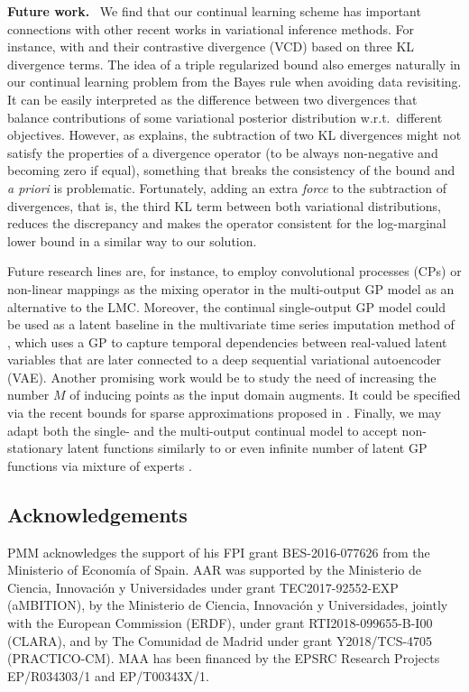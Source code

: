 \documentclass[]{article}
\begin{document}
\textbf{Future work.}~ We find that our continual learning scheme has important connections with other recent works in variational inference methods. For instance, with \citet{ruiz2019contrastive} and their contrastive divergence (VCD) based on three KL divergence terms. The idea of a triple regularized bound also emerges naturally in our continual learning problem from the Bayes rule when avoiding data revisiting. It can be easily interpreted as the difference between two divergences that balance contributions of some variational posterior distribution w.r.t.\ different objectives. However, as \citet{ruiz2019contrastive} explains, the subtraction of two KL divergences might not satisfy the properties of a divergence operator (to be always non-negative and becoming zero if equal), something that breaks the consistency of the bound and \textit{a priori} is problematic. Fortunately, adding an extra \textit{force} to the subtraction of divergences, that is, the third KL term between both variational distributions, reduces the discrepancy and makes the operator consistent for the log-marginal lower bound in a similar way to our solution. 

Future research lines are, for instance, to employ convolutional processes (CPs) or non-linear mappings as the mixing operator in the multi-output GP model as an alternative to the LMC. Moreover, the continual single-output GP model could be used as a latent baseline in the multivariate time series imputation method of \citet{fortuin2019multivariate}, which uses a GP to capture temporal dependencies between real-valued latent variables that are later connected to a deep sequential variational autoencoder (VAE). Another promising work would be to study the need of  increasing the number $M$ of inducing points as the input domain augments. It could be specified via the recent bounds for sparse approximations proposed in \citet{burt2019rates}. Finally, we may adapt both the single- and the multi-output continual model to accept non-stationary latent functions similarly to \citet{zhang2019sequential} or even infinite number of latent GP functions via mixture of experts \citep{pradier2018infinite}.

\subsection*{Acknowledgements}

PMM acknowledges the support of his FPI grant BES-2016-077626 from the Ministerio of Econom\'ia of Spain. AAR was supported by the Ministerio de Ciencia, Innovaci{\'o}n y Universidades under grant TEC2017-92552-EXP (aMBITION), by the Ministerio de Ciencia, Innovaci{\'o}n y Universidades, jointly with the European Commission (ERDF), under grant  RTI2018-099655-B-I00 (CLARA), and by The Comunidad de Madrid under grant Y2018/TCS-4705 (PRACTICO-CM). MAA has been financed by the EPSRC Research Projects EP/R034303/1 and EP/T00343X/1.
\end{document}
